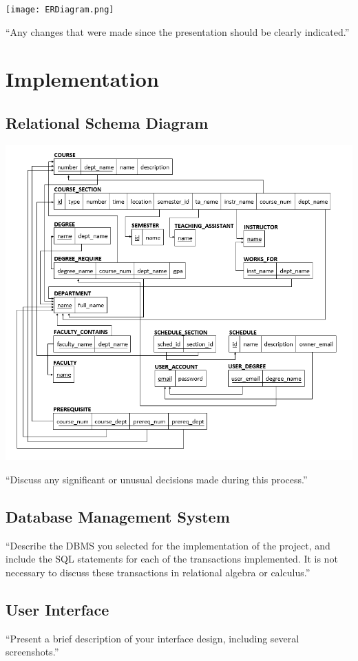 \documentclass[twoside=false,a4paper,11pt]{article}
\theoremstyle{mytheor}
\begin{document}
\texttt{[image: ERDiagram.png]}

``Any changes that were made since the presentation should be clearly indicated.''

\section*{Implementation}

\subsection*{Relational Schema Diagram}

\includegraphics[width=\textwidth]{RelationalSchemaDiagram.png}

``Discuss any significant or unusual decisions made during this process.''

\subsection*{Database Management System}

``Describe the DBMS you selected for the implementation	of the project, and include the SQL statements for each of the transactions implemented. It is not necessary to discuss these transactions in relational algebra or calculus.''

\subsection*{User Interface}

``Present a brief description of your interface design, including several screenshots.''
\end{document}
